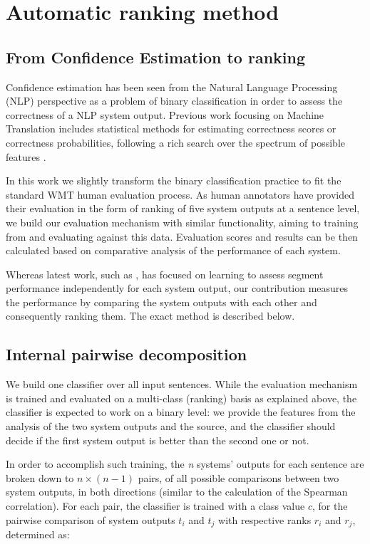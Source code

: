 \documentclass[11pt]{article}
\begin{document}
\section{Automatic ranking method}
\subsection{From Confidence Estimation to ranking}
Confidence estimation has been seen from the Natural Language Processing (NLP)
perspective as a problem of binary classification in order to assess the
correctness of a NLP system output. Previous work focusing on Machine
Translation includes statistical methods for estimating correctness scores or
correctness probabilities, following a rich search over the spectrum of
possible features
\cite{Blatz:2004:CEM:1220355.1220401,Ueffing05word-levelconfidence,Specia09TWSS,raybaud2009word,Rosti07combiningoutputs}.

In this work we slightly transform the binary classification practice to fit
the standard WMT human evaluation process. As human annotators have provided
their evaluation in the form of ranking of five system outputs at a sentence
level, we build our evaluation mechanism with similar functionality, aiming to
training from and evaluating against this data. Evaluation scores and results
can be then calculated based on comparative analysis of the performance of each
system. 

Whereas latest work, such as , has
focused on learning to assess segment performance independently for each
system output, our contribution measures the performance by comparing the system
outputs with each other and consequently ranking them. The exact method is
described below.

\subsection{Internal pairwise decomposition\label{Internal pairwise
decomposition} }
We build one classifier over all input sentences. While the evaluation
mechanism is trained and evaluated on a multi-class (ranking) basis as explained
above, the classifier is expected to work on a binary level: we provide the
features from the analysis of the two system outputs and the source, and the
classifier should decide if the first system output is better than the second one or
not. 

In order to accomplish such training, the \textit{n} systems' outputs for each
sentence are broken down to \(n \times (n-1)\) pairs, of all possible
comparisons between two system outputs, in both directions (similar to the
calculation of the Spearman correlation).
% 
For each pair, the classifier is trained with a class value \(c\), for the
pairwise comparison of system outputs $t_i$ and $t_j$ with respective ranks
\(r_i\) and \(r_j\), determined as:
\end{document}
